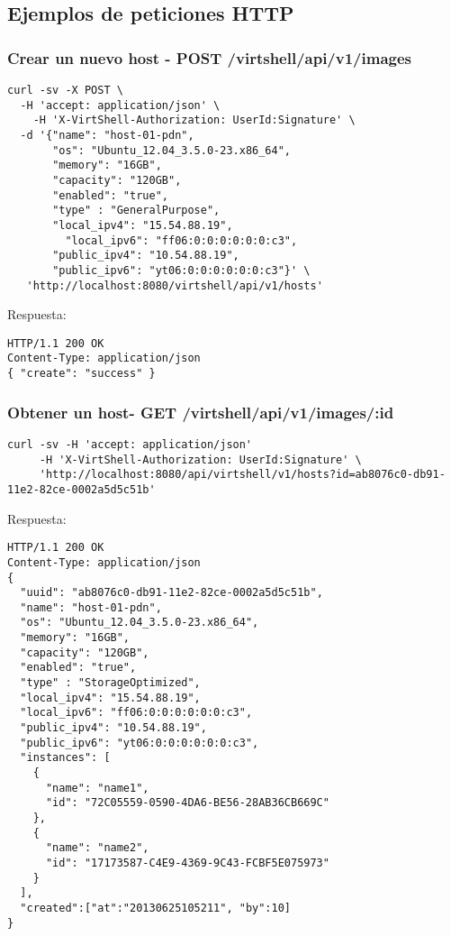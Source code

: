 \subsection{Ejemplos de peticiones HTTP}

\subsubsection{Crear un nuevo host - POST /virtshell/api/v1/images}

\begin{lstlisting}[style=json]
curl -sv -X POST \
  -H 'accept: application/json' \
    -H 'X-VirtShell-Authorization: UserId:Signature' \
  -d '{"name": "host-01-pdn",
       "os": "Ubuntu_12.04_3.5.0-23.x86_64",
       "memory": "16GB",
       "capacity": "120GB",
       "enabled": "true",
       "type" : "GeneralPurpose",
       "local_ipv4": "15.54.88.19",
         "local_ipv6": "ff06:0:0:0:0:0:0:c3",
       "public_ipv4": "10.54.88.19",
       "public_ipv6": "yt06:0:0:0:0:0:0:c3"}' \
   'http://localhost:8080/virtshell/api/v1/hosts'
\end{lstlisting}

\vspace{1cm}
Respuesta:
\vspace{1cm}

\begin{lstlisting}[style=json]
HTTP/1.1 200 OK
Content-Type: application/json
{ "create": "success" }
\end{lstlisting}

\subsubsection{Obtener un host- GET /virtshell/api/v1/images/:id}

\begin{lstlisting}[style=json]
curl -sv -H 'accept: application/json' 
     -H 'X-VirtShell-Authorization: UserId:Signature' \ 
     'http://localhost:8080/api/virtshell/v1/hosts?id=ab8076c0-db91-11e2-82ce-0002a5d5c51b'
\end{lstlisting}

\vspace{1cm}
Respuesta:
\vspace{1cm}

\begin{lstlisting}[style=json]
HTTP/1.1 200 OK
Content-Type: application/json
{
  "uuid": "ab8076c0-db91-11e2-82ce-0002a5d5c51b",
  "name": "host-01-pdn",
  "os": "Ubuntu_12.04_3.5.0-23.x86_64",
  "memory": "16GB",
  "capacity": "120GB",
  "enabled": "true",
  "type" : "StorageOptimized",
  "local_ipv4": "15.54.88.19",
  "local_ipv6": "ff06:0:0:0:0:0:0:c3",
  "public_ipv4": "10.54.88.19",
  "public_ipv6": "yt06:0:0:0:0:0:0:c3",
  "instances": [
    {
      "name": "name1",
      "id": "72C05559-0590-4DA6-BE56-28AB36CB669C"
    },
    {
      "name": "name2",
      "id": "17173587-C4E9-4369-9C43-FCBF5E075973"
    }
  ],
  "created":["at":"20130625105211", "by":10]
}
\end{lstlisting}


